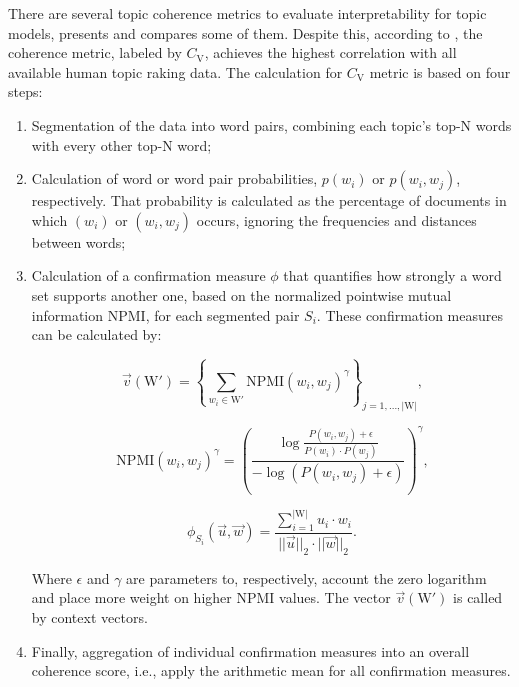 	There are several topic coherence metrics to evaluate interpretability for topic models,  presents and compares some of them.
	Despite this, according to , the coherence metric, labeled by $C_{\text{V}}$, achieves the highest correlation with all available human topic raking data. The calculation for $C_{\text{V}}$ metric is based on four steps:
	
	\begin{enumerate}
		\item Segmentation of the data into word pairs, combining each topic's top-N words with every other top-N word;
		
		\item Calculation of word or word pair probabilities, $p(w_{i})$ or $p(w_{i}, w_{j})$, respectively. That probability is calculated as the percentage of documents in which $(w_{i})$ or $(w_{i},w_{j})$ occurs, ignoring the frequencies and distances between words;
		
		\item Calculation of a confirmation measure $\phi$ that quantifies how strongly a word set supports another one, based on the normalized pointwise mutual information $\text{NPMI}$, for each segmented pair $S_{i}$. These confirmation measures can be calculated by:
		
		\begin{equation}
			\vec v (\text{W}') = \left\{ \sum_{w_{i} \in \text{W}'} \text{NPMI} (w_{i}, w_{j})^{\gamma} \right\}_{j=1,...,|\text{W}|} \text{,}
		\end{equation}
	
		\begin{equation}
			\text{NPMI} (w_{i}, w_{j})^{\gamma} = \left( \dfrac{\log \frac{P(w_{i}, w_{j}) + \epsilon}{P(w_{i}) \cdot P(w_{j})} }{- \log (P(w_{i}, w_{j}) + \epsilon) } \right)^{\gamma} \text{,}
		\end{equation}
	
		\begin{equation}
			\phi_{S_{i}}(\vec u , \vec w) = \dfrac{ \sum_{i=1}^{|\text{W}|} u_{i} \cdot w_{i} }{||\vec{u}||_{2} \cdot ||\vec{w}||_{2}} \text{.}
		\end{equation}
	
		Where $\epsilon$ and $\gamma$ are parameters to, respectively, account the zero logarithm and place more weight on higher $\text{NPMI}$ values. The vector $\vec{v}(\text{W}')$ is called by context vectors.
	
		\item Finally, aggregation of individual confirmation measures into an overall coherence score, i.e., apply the arithmetic mean for all confirmation measures.
	\end{enumerate}
	
